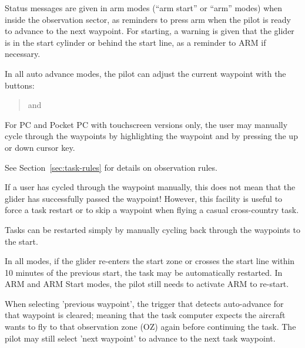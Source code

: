 \documentclass[a4paper,12pt]{refrep}
\begin{document}
Status messages are given in arm modes (``arm start'' or ``arm''
modes) when inside the observation sector, as reminders to press arm
when the pilot is ready to advance to the next waypoint.
For starting, a warning is given that the glider is in the start
cylinder or behind the start line, as a reminder to ARM if necessary.

In all auto advance modes, the pilot can adjust the current waypoint
with the buttons:

\begin{quote}
\blink{} and \blink{}
\end{quote}

For PC and Pocket PC with touchscreen versions only, the user may
manually cycle through the waypoints by highlighting the waypoint
{\InfoBox} and by pressing the up or down cursor key.

See Section~\ref{sec:task-rules} for details on observation rules.

If a user has cycled through the waypoint manually, this does not mean
that the glider has successfully passed the waypoint!  However, this
facility is useful to force a task restart or to skip a waypoint when
flying a casual cross-country task.

\tip Tasks can be restarted simply by manually cycling back through the
waypoints to the start.

In all modes, if the glider re-enters the start zone or crosses the
start line within 10 minutes of the previous start, the task may be
automatically restarted.  In ARM and ARM Start modes, the pilot still
needs to activate ARM to re-start.

When selecting 'previous waypoint', the trigger that detects
auto-advance for that waypoint is cleared; meaning that the task
computer expects the aircraft wants to fly to that observation zone (OZ)
again before continuing the task.  The pilot may still select 'next
waypoint' to advance to the next task waypoint.
\end{document}
